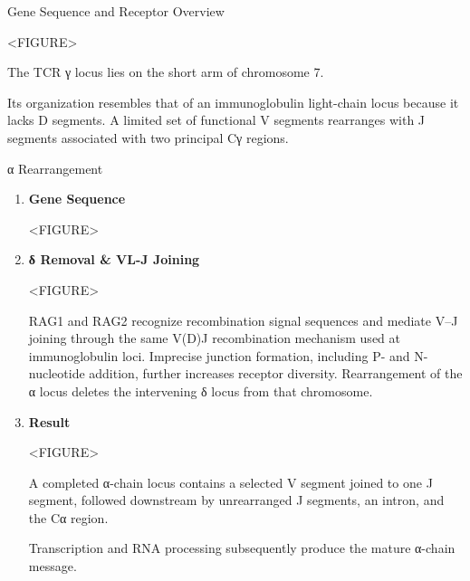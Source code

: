\begin{core}{Gene Sequence and Receptor Overview}
\begin{enumerate}
            <FIGURE>

            The TCR γ locus lies on the short arm of chromosome 7.

            Its organization resembles that of an immunoglobulin light-chain locus because it lacks D segments. A limited set of functional V segments rearranges with J segments associated with two principal Cγ regions.

        \end{enumerate}

      \end{core}

      \begin{core}{α Rearrangement}

        \begin{enumerate}[label=(\arabic*)]

          \item \textbf{Gene Sequence}

            <FIGURE>

          \item \textbf{δ Removal \& VL-J Joining}

            <FIGURE>

            RAG1 and RAG2 recognize recombination signal sequences and mediate V--J joining through the same V(D)J recombination mechanism used at immunoglobulin loci. Imprecise junction formation, including P- and N-nucleotide addition, further increases receptor diversity. Rearrangement of the α locus deletes the intervening δ locus from that chromosome.

          \item \textbf{Result}

            <FIGURE>

            A completed α-chain locus contains a selected V segment joined to one J segment, followed downstream by unrearranged J segments, an intron, and the Cα region.

            Transcription and RNA processing subsequently produce the mature α-chain message.

        \end{enumerate}

      \end{core}

